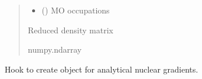 \documentclass[letterpaper,10pt,english]{sphinxmanual}
\begin{document}
\begin{fulllineitems}
\begin{fulllineitems}
\begin{quote}
\begin{description}
\begin{itemize}
\item {} 
\sphinxAtStartPar
{} () \textendash{} MO occupations

\end{itemize}

\sphinxAtStartPar
Reduced density matrix

\sphinxAtStartPar
numpy.ndarray

\end{description}\end{quote}

\end{fulllineitems}


\begin{fulllineitems}
\label{\detokenize{fcdft.wbl:fcdft.wbl.rks.WBLMoleculeRKS.nuc_grad_method}}
\pysigstartsignatures
\pysiglinewithargsret
{}
{}
{}
\pysigstopsignatures
\sphinxAtStartPar
Hook to create object for analytical nuclear gradients.

\end{fulllineitems}


\end{fulllineitems}

\end{document}
